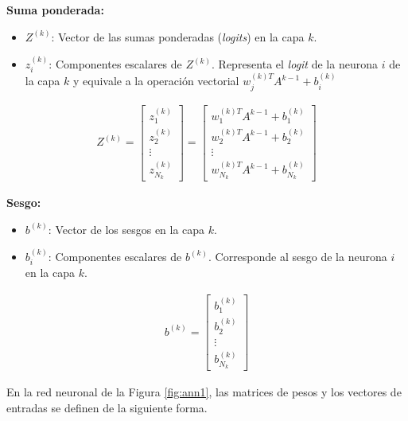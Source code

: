 \textbf{Suma ponderada:}
\begin{itemize}
    \item $Z^{(k)}$: Vector de las sumas ponderadas (\emph{logits}) en la capa $k$.
    \item $z_i^{(k)}$: Componentes escalares de $Z^{(k)}$. Representa el \emph{logit} de la neurona $i$ de la capa $k$ y equivale a la operación vectorial $w_j^{(k)T} A^{k-1} + b_i^{(k)}$
\end{itemize}
%
\begin{align*}
    Z^{(k)} = \begin{bmatrix} 
                z_1^{(k)} \\ 
                z_2^{(k)} \\ 
                \vdots \\ 
                z_{N_k}^{(k)} 
              \end{bmatrix}
            = \begin{bmatrix} 
                w_{1}^{(k)T} A^{k-1} + b_1^{(k)} \\ 
                w_{2}^{(k)T} A^{k-1} + b_2^{(k)} \\ 
                \vdots \\ 
                w_{N_k}^{(k)T} A^{k-1} + b_{N_k}^{(k)} 
              \end{bmatrix}
\end{align*}
%

\textbf{Sesgo:}
\begin{itemize}
    \item $b^{(k)}$: Vector de los sesgos en la capa $k$.
    \item $b_i^{(k)}$: Componentes escalares de $b^{(k)}$. Corresponde al sesgo de la neurona $i$ en la capa $k$.
\end{itemize}
%
\begin{align*}
    b^{(k)} = \begin{bmatrix} 
                b_1^{(k)} \\ 
                b_2^{(k)} \\ 
                \vdots \\ 
                b_{N_k}^{(k)} 
              \end{bmatrix}
\end{align*}
%

En la red neuronal de la Figura \ref{fig:ann1}, las matrices de pesos y los vectores de entradas se definen de la siguiente forma.
%

%

